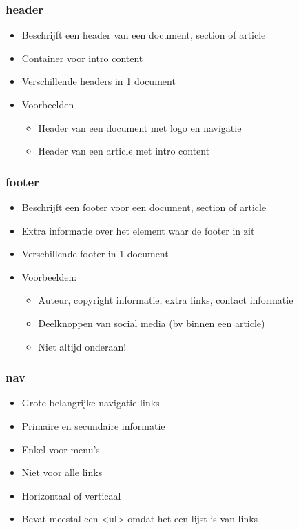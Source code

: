 \documentclass{article}
\begin{document}
\subsubsection {header}
\begin{itemize}
    \item Beschrijft een header van een document, section of article
    \item Container voor intro content
    \item Verschillende headers in 1 document
    \item Voorbeelden
    \begin{itemize}
        \item Header van een document met logo en navigatie
        \item Header van een article met intro content
    \end{itemize}
\end{itemize}

\subsubsection {footer}
\begin{itemize}
    \item Beschrijft een footer voor een document, section of article
    \item Extra informatie over het element waar de footer in zit
    \item Verschillende footer in 1 document
    \item Voorbeelden:
    \begin{itemize}
        \item Auteur, copyright informatie, extra links, contact informatie
        \item Deelknoppen van social media (bv binnen een article)
        \item Niet altijd onderaan!
    \end{itemize}
\end{itemize}

\subsubsection {nav}
\begin{itemize}
    \item Grote belangrijke navigatie links
    \item Primaire en secundaire informatie
    \item Enkel voor menu's
    \item Niet voor alle links
    \item Horizontaal of verticaal
    \item Bevat meestal een <ul> omdat het een lijst is van links
\end{itemize}
\end{document}
